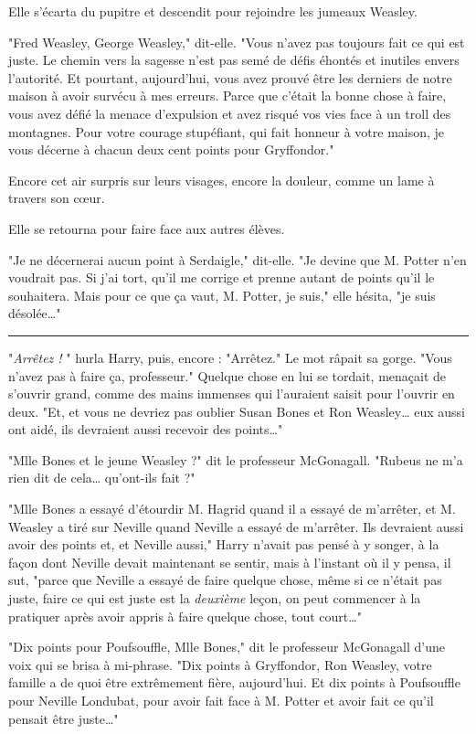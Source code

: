 Elle s'écarta du pupitre et descendit pour rejoindre les jumeaux Weasley.

"Fred Weasley, George Weasley," dit-elle. "Vous n'avez pas toujours fait ce qui est juste. Le chemin vers la sagesse n'est pas semé de défis éhontés et inutiles envers l'autorité. Et pourtant, aujourd'hui, vous avez prouvé être les derniers de notre maison à avoir survécu à mes erreurs. Parce que c'était la bonne chose à faire, vous avez défié la menace d'expulsion et avez risqué vos vies face à un troll des montagnes. Pour votre courage stupéfiant, qui fait honneur à votre maison, je vous décerne à chacun deux cent points pour Gryffondor."

Encore cet air surpris sur leurs visages, encore la douleur, comme un lame à travers son cœur.

Elle se retourna pour faire face aux autres élèves.

"Je ne décernerai aucun point à Serdaigle," dit-elle. "Je devine que M. Potter n'en voudrait pas. Si j'ai tort, qu'il me corrige et prenne autant de points qu'il le souhaitera. Mais pour ce que ça vaut, M. Potter, je suis," elle hésita, "je suis désolée…"
\par\noindent\rule{\textwidth}{0.4pt}
"\emph{Arrêtez !} " hurla Harry, puis, encore : "Arrêtez." Le mot râpait sa gorge. "Vous n'avez pas à faire ça, professeur." Quelque chose en lui se tordait, menaçait de s'ouvrir grand, comme des mains immenses qui l'auraient saisit pour l'ouvrir en deux. "Et, et vous ne devriez pas oublier Susan Bones et Ron Weasley… eux aussi ont aidé, ils devraient aussi recevoir des points…"

"Mlle Bones et le jeune Weasley ?" dit le professeur McGonagall. "Rubeus ne m'a rien dit de cela… qu'ont-ils fait ?"

"Mlle Bones a essayé d'étourdir M. Hagrid quand il a essayé de m'arrêter, et M. Weasley a tiré sur Neville quand Neville a essayé de m'arrêter. Ils devraient aussi avoir des points et, et Neville aussi," Harry n'avait pas pensé à y songer, à la façon dont Neville devait maintenant se sentir, mais à l'instant où il y pensa, il sut, "parce que Neville a essayé de faire quelque chose, même si ce n'était pas juste, faire ce qui est juste est la \emph{deuxième}  leçon, on peut commencer à la pratiquer après avoir appris à faire quelque chose, tout court…"

"Dix points pour Poufsouffle, Mlle Bones," dit le professeur McGonagall d'une voix qui se brisa à mi-phrase. "Dix points à Gryffondor, Ron Weasley, votre famille a de quoi être extrêmement fière, aujourd'hui. Et dix points à Poufsouffle pour Neville Londubat, pour avoir fait face à M. Potter et avoir fait ce qu'il pensait être juste…"


